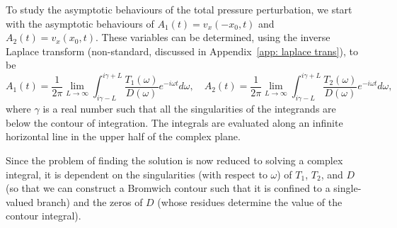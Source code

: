 \documentclass[12pt]{../style-files/ociamthesis}
\begin{document}
To study the asymptotic behaviours of the total pressure perturbation, we start with the asymptotic behaviours of $A_1(t) = v_x(-x_0, t)$ and $A_2(t) = v_x(x_0, t)$. These variables can be determined, using the inverse Laplace transform (non-standard, discussed in Appendix~\ref{app: laplace trans}), to be
\begin{equation}
A_1(t) = \frac{1}{2\pi} \lim_{L \to \infty} \int_{i\gamma - L}^{i\gamma + L} \frac{T_1(\omega)}{D(\omega)} e^{-i\omega t} d\omega, \quad A_2(t) = \frac{1}{2\pi} \lim_{L \to \infty} \int_{i\gamma - L}^{i\gamma + L} \frac{T_2(\omega)}{D(\omega)} e^{-i\omega t} d\omega,
\label{A inv laplace}
\end{equation}
where $\gamma$ is a real number such that all the singularities of the integrands are below the contour of integration. The integrals are evaluated along an infinite horizontal line in the upper half of the complex plane.

Since the problem of finding the solution is now reduced to solving a complex integral, it is dependent on the singularities (with respect to $\omega$) of $T_1$, $T_2$, and $D$ (so that we can construct a Bromwich contour such that it is confined to a single-valued branch) and the zeros of $D$ (whose residues determine the value of the contour integral).
\end{document}
